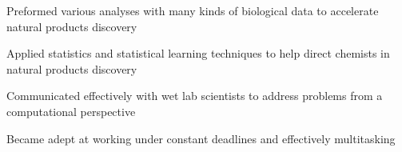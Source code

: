 \begin{cventries}
      {}%
      {
        \begin{cvitems}
         \item {Preformed various analyses with many kinds of biological data to accelerate natural products discovery}
         \item {Applied statistics and statistical learning techniques to help direct chemists in natural products discovery}
         \item {Communicated effectively with wet lab scientists to address problems from a computational perspective}
         \item {Became adept at working under constant deadlines and effectively multitasking}
        \end{cvitems}
      }
\end{cventries}
